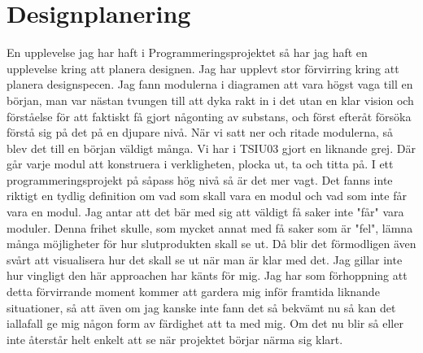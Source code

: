 \section{Designplanering}

En upplevelse jag har haft i Programmeringsprojektet så har jag haft en upplevelse kring att planera designen. Jag har upplevt stor förvirring kring att planera designspecen. Jag fann modulerna i diagramen att vara högst vaga till en början, man var nästan tvungen till att dyka rakt in i det utan en klar vision och förståelse för att faktiskt få gjort någonting av substans, och först efteråt  försöka förstå sig på det på en djupare nivå.
När vi satt ner och ritade modulerna, så blev det till en början väldigt många. Vi har i TSIU03 gjort en liknande grej. Där går varje modul att konstruera i verkligheten, plocka ut, ta och titta på. I ett programmeringsprojekt på såpass hög nivå så är det mer vagt. Det fanns inte riktigt en tydlig definition om vad som skall vara en modul och vad som inte får vara en modul. Jag antar att det bär med sig att väldigt få saker inte "får" vara moduler. Denna frihet skulle, som mycket annat med få saker som är "fel", lämna många möjligheter för hur slutprodukten skall se ut. Då blir det förmodligen även svårt att visualisera hur det skall se ut när man är klar med det. 
Jag gillar inte hur vingligt den här approachen har känts för mig. Jag har som förhoppning att detta förvirrande moment kommer att gardera mig inför framtida liknande situationer, så att även om jag kanske inte fann det så bekvämt nu så kan det iallafall ge mig någon form av färdighet att ta med mig. Om det nu blir så eller inte återstår helt enkelt att se när projektet börjar närma sig klart. 
